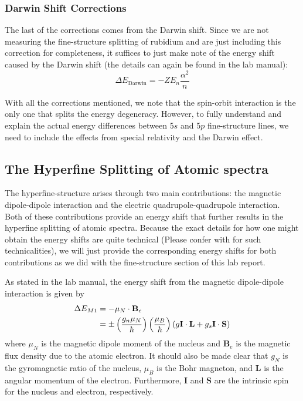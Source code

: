 \documentclass[twocolumn,amsmath,amssymb,pra, floatfix]{revtex4-2}
\begin{document}
\subsubsection{Darwin Shift Corrections}
The last of the corrections comes from the Darwin shift. Since we are not measuring the fine-structure splitting of rubidium and are just including this correction for completeness, it suffices to just make note of the energy shift caused by the Darwin shift (the details can again be found in the lab manual):
\begin{equation}
    \Delta E_{\mathrm{Darwin}}
    =
    - Z E_{n} \frac{\alpha^{2}}{n}
\end{equation}

With all the corrections mentioned, we note that the spin-orbit interaction is the only one that splits the energy degeneracy. However, to fully understand and explain the actual energy differences between 5$s$ and 5$p$ fine-structure lines, we need to include the effects from special relativity and the Darwin effect.

\subsection{The Hyperfine Splitting of Atomic spectra}
The hyperfine-structure arises through two main contributions: the magnetic dipole-dipole interaction and the electric quadrupole-quadrupole interaction. Both of these contributions provide an energy shift that further results in the hyperfine splitting of atomic spectra. Because the exact details for how one might obtain the energy shifts are quite technical (Please confer with \cite{gatech} for such technicalities), we will just provide the corresponding energy shifts for both contributions as we did with the fine-structure section of this lab report. 

As stated in the lab manual, the energy shift from the magnetic dipole-dipole interaction is given by
\begin{align}
    \Delta E_{M1}
    &=
    - \mu_{N} \cdot \mathbf{B}_{e}
    \notag 
    \\
    &=
    \pm 
    \left( \frac{g_{n} \mu_{N}}{\hbar} \right) 
    \left( \frac{\mu_{B}}{\hbar} \right) 
    \left( g \mathbf{I} \cdot \mathbf{L} + g_{s} \mathbf{I} \cdot \mathbf{S} \right)
    \label{eq:hfs-1}
\end{align} 
where $\mu_{N}$ is the magnetic dipole moment of the nucleus and $\mathbf{B}_{e}$ is the magnetic flux density due to the atomic electron. It should also be made clear that $g_{N}$ is the gyromagnetic ratio of the nucleus, $\mu_{B}$ is the Bohr magneton, and $\mathbf{L}$ is the angular momentum of the electron. Furthermore, $\mathbf{I}$ and $\mathbf{S}$ are the intrinsic spin for the nucleus and electron, respectively.
\end{document}
